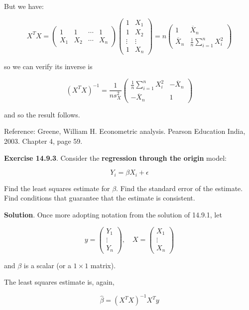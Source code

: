 But we have:

\[ X^T X = \begin{pmatrix}
1 & 1 & \cdots & 1 \\
X_1 & X_2 & \cdots & X_n
\end{pmatrix} \begin{pmatrix}
1 & X_1 \\
1 & X_2 \\
\vdots & \vdots \\
1 & X_n
\end{pmatrix} = 
n \begin{pmatrix}
1 & \overline{X}_n \\
\overline{X}_n & \frac{1}{n}\sum_{i=1}^n X_i^2
\end{pmatrix}
\]

so we can verify its inverse is

\[(X^T X)^{-1} = \frac{1}{n s_X^2} \begin{pmatrix}
\frac{1}{n} \sum_{i=1}^n X_i^2 & - \overline{X}_n \\
-\overline{X}_n & 1
\end{pmatrix}\]

and so the result follows.

Reference: Greene, William H. Econometric analysis. Pearson Education
India, 2003. Chapter 4, page 59.

\textbf{Exercise 14.9.3}. Consider the \textbf{regression through the
origin} model:

\[Y_i = \beta X_i + \epsilon\]

Find the least squares estimate for \(\beta\). Find the standard error
of the estimate. Find conditions that guarantee that the estimate is
consistent.

\textbf{Solution}. Once more adopting notation from the solution of
14.9.1, let

\[ y = \begin{pmatrix} Y_1 \\ \vdots \\ Y_n \end{pmatrix},
\quad
X = \begin{pmatrix} X_1 \\ \vdots \\ X_n \end{pmatrix}\]

and \(\beta\) is a scalar (or a \(1 \times 1\) matrix).

The least squares estimate is, again,

\[\hat{\beta} = (X^T X)^{-1} X^T y\]

